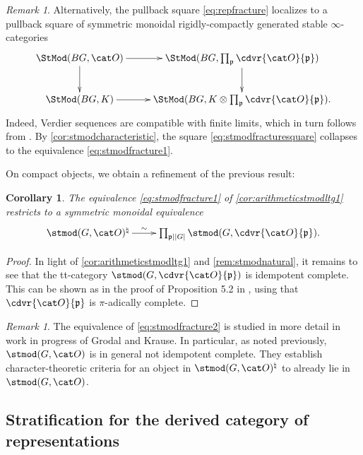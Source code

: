 \documentclass{amsart}%
\numberwithin{equation}{section}%
\newtheorem{Cor}[equation]{Corollary}
\theoremstyle{remark}
\newtheorem{Rem}[equation]{Remark}
\begin{document}
\begin{Rem}
Alternatively, the pullback square \eqref{eq:repfracture} localizes to a pullback square of symmetric monoidal rigidly-compactly generated stable $\infty$-categories
\begin{equation}\label{eq:stmodfracturesquare}
    \vcenter{
        \xymatrix{\StMod(BG,\cat O) \ar[r] \ar[d] & \StMod(BG,\prod_{\frak p}\cdvr{\cat O}{\frak p}) \ar[d] \\
        \StMod(BG,K) \ar[r] & \StMod(BG,K\otimes\prod_{\frak p}\cdvr{\cat O}{\frak p}).}
    }
\end{equation}
Indeed, Verdier sequences are compatible with finite limits, which in turn follows from \cite[Thm.~I.3.3]{NikolausScholze18}. By \cref{cor:stmodcharacteristic}, the square \eqref{eq:stmodfracturesquare} collapses to the equivalence \eqref{eq:stmodfracture1}.
\end{Rem}

On compact objects, we obtain a refinement of the previous result: 

\begin{Cor}\label{cor:arithmeticstmodltg2}
The equivalence \eqref{eq:stmodfracture1} of \cref{cor:arithmeticstmodltg1} restricts to a symmetric monoidal equivalence
\begin{equation}\label{eq:stmodfracture2}
    \xymatrix{\stmod(G,\cat O)^{\natural} \ar[r]^-{\sim} & \prod_{\frak p\mid |G|}\stmod(G, \cdvr{\cat O}{\frak p}).}
\end{equation}
\end{Cor}
\begin{proof}
In light of \cref{cor:arithmeticstmodltg1} and \cref{rem:stmodnatural}, it remains to see that the tt-category $\stmod(G, \cdvr{\cat O}{\frak p})$ is idempotent complete. This can be shown as in the proof of Proposition 5.2 in \cite{krause_picard}, using that $\cdvr{\cat O}{\frak p}$ is $\pi$-adically complete.
\end{proof}

\begin{Rem}
The equivalence of \eqref{eq:stmodfracture2} is studied in more detail in work in progress of Grodal and Krause. In particular, as noted previously, $\stmod(G,\cat O)$ is in general not idempotent complete. They establish character-theoretic criteria for an object in $\stmod(G,\cat O)^{\natural}$ to already lie in $\stmod(G,\cat O)$.
\end{Rem}


\subsection{Stratification for the derived category of representations}\label{ssec:stratrepiffstmod}
\end{document}
